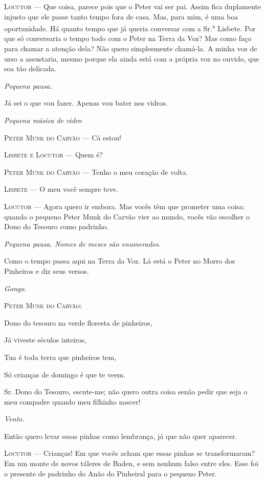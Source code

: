 \textsc{Locutor} --- Que coisa, parece pois que o Peter vai ser pai. Assim fica
duplamente injusto que ele passe tanto tempo fora de casa. Mas, para
mim, é uma boa oportunidade. Há quanto tempo que já queria conversar com
a Sr.\textsuperscript{a} Lisbete. Por que só conversaria o tempo todo
com o Peter na Terra da Voz? Mas como faço para chamar a atenção dela?
Não quero simplesmente chamá-la. A minha voz de urso a assustaria, mesmo
porque ela ainda está com a própria voz no ouvido, que soa tão delicada.

\emph{Pequena pausa.}

Já sei o que vou fazer. Apenas vou bater nos vidros.

\emph{Pequena música de vidro}

\textsc{Peter Munk do Carvão} --- Cá estou!

\textsc{Lisbete e Locutor} --- Quem é?

\textsc{Peter Munk do Carvão} --- Tenho o meu coração de volta.

\textsc{Lisbete} --- O meu você sempre teve.

\textsc{Locutor} --- Agora quero ir embora. Mas vocês têm que prometer uma coisa:
quando o pequeno Peter Munk do Carvão vier ao mundo, vocês vão escolher
o Dono do Tesouro como padrinho.

\emph{Pequena pausa. Nomes de meses são enumerados.}

Como o tempo passa aqui na Terra da Voz. Lá está o Peter no Morro dos
Pinheiros e diz seus versos.

\emph{Gongo.}

\textsc{Peter Munk do Carvão}:

Dono do tesouro na verde floresta de pinheiros,

Já viveste séculos inteiros,

Tua é toda terra que pinheiros tem,

Só crianças de domingo é que te veem.

Sr. Dono do Tesouro, escute-me; não quero outra coisa senão pedir que
seja o meu compadre quando meu filhinho nascer!

\emph{Vento.}

Então quero levar essas pinhas como lembrança, já que não quer aparecer.

\textsc{Locutor} --- Crianças! Em que vocês acham que essas pinhas se
transformaram? Em um monte de novos táleres de Baden, e sem nenhum falso
entre eles. Esse foi o presente de padrinho do Anão do Pinheiral para o
pequeno Peter.

